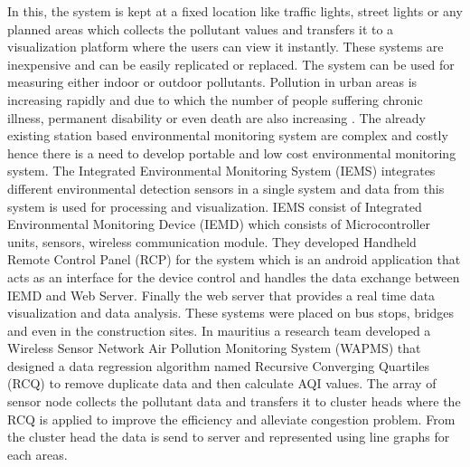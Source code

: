  In this, the system is kept at a fixed location like traffic lights, street lights or any planned areas \cite{Pavani2017} which collects the pollutant values and transfers it to a visualization platform where the users can view it instantly. These systems are inexpensive and can be easily replicated or replaced. The system can be used for measuring either indoor or outdoor pollutants. Pollution in urban areas is increasing rapidly and due to which the number of people suffering chronic illness, permanent disability or even death are also increasing \cite{Wong2014}. The already existing station based environmental monitoring system are complex and costly hence there is a need to develop portable and low cost environmental monitoring system. The Integrated Environmental Monitoring System (IEMS)\cite{Wong2014} integrates different environmental detection sensors in a single  system and data from this system is used for processing and visualization. IEMS consist of Integrated Environmental Monitoring Device (IEMD) which consists of Microcontroller units, sensors, wireless communication module. They developed Handheld Remote Control Panel (RCP) for the system which is an android application that acts as an interface for the device control and handles the data exchange between IEMD and Web Server. Finally the web server that provides a real time data visualization and data analysis. These systems were placed on bus stops, bridges and even in the construction sites. In mauritius a research team developed a Wireless Sensor Network Air Pollution Monitoring System (WAPMS) \cite{K.Khedo2010} that designed a data regression algorithm named Recursive Converging Quartiles (RCQ) to remove duplicate data and then calculate AQI values. The array of sensor node collects the pollutant data and transfers it to cluster heads where the RCQ is applied to improve the efficiency and alleviate congestion problem. From the cluster head the data is send to server and represented using line graphs for each areas.

